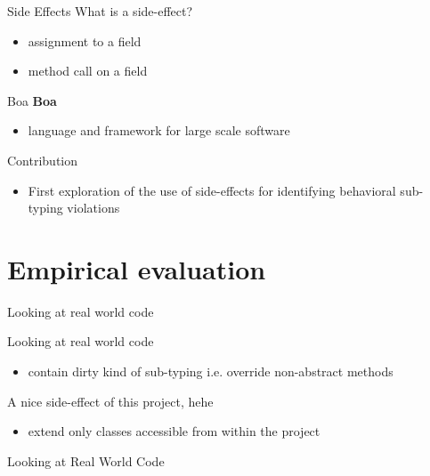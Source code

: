 \documentclass{beamer}
\begin{document}
\begin{frame}{Side Effects}
\Huge
What is a side-effect?
\huge
\begin{itemize}
  \item \pause assignment to a field
  \item \pause method call on a field
\end{itemize}
\end{frame}

\begin{frame}{Boa}
\huge
\textbf{Boa}
\begin{itemize}
  \item \pause language and framework for large scale software
\end{itemize}

\end{frame}

\begin{frame}{Contribution}
\huge
\begin{itemize}
  \item First exploration of the use of side-effects for identifying behavioral sub-typing violations
\end{itemize}
\end{frame}

\section{Empirical evaluation}
\begin{frame}{Looking at real world code}
\Huge
{}
\end{frame}

\begin{frame}{Looking at real world code}
\Huge
{}
\normalsize


\pause \begin{itemize}
\item contain dirty kind of sub-typing \pause i.e. override non-abstract methods
\end{itemize}
\Large

\pause A nice side-effect of this project, \pause hehe

\normalsize
\pause \begin{itemize}
\item extend only classes accessible from within the project
\end{itemize}
\end{frame}

\begin{frame}{Looking at Real World Code}
\Huge
{}
\end{frame}
\end{document}
